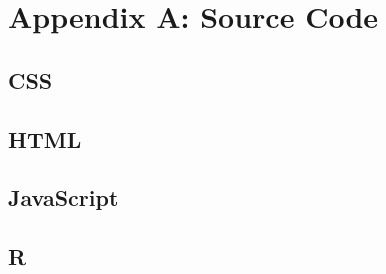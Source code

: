 \documentclass[12pt]{article}
\begin{document}







\section{Appendix A: Source Code}

\subsection{CSS}

\subsection{HTML}

\subsection{JavaScript}

\subsection{R}
\end{document}
